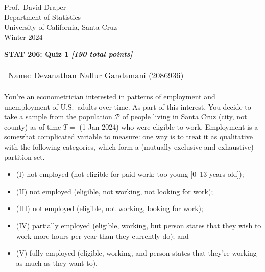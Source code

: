 \documentclass[12pt]{article}
\begin{document}
\begin{flushleft}

Prof.~David Draper \\
Department of Statistics \\
University of California, Santa Cruz \\
Winter 2024

\end{flushleft}

\begin{center}

\textbf{\large STAT 206: {\color{BrickRed} Quiz 1} \textit{[190 total points]}}

\end{center}

\begin{tabular}{ll}

\hspace*{-0.14in} Name: \underline{Devanathan Nallur Gandamani (2086936) \hspace*{3.0in}} \\

\end{tabular}

\vspace*{0.1in}

You're an econometrician interested in patterns of employment and unemployment of U.S.~adults over time. As part of this interest, You decide to take a sample from the population $\mathcal{ P }$ of people living in Santa Cruz (city, not county) as of time $T =$ (1 Jan 2024) who were eligible to work. Employment is a somewhat complicated variable to measure: one way is to treat it as qualitative with the following categories, which form a (mutually exclusive and exhaustive) partition set.

\begin{itemize}

\item

(I) not employed (not eligible for paid work: too young [0--13 years old]);

\item

(II) not employed (eligible, not working, not looking for work);

\item

(III) not employed (eligible, not working, looking for work);

\item

(IV) partially employed (eligible, working, but person states that they wish to work more hours per year than they currently do); and

\item

(V) fully employed (eligible, working, and person states that they're working as much as they want to).

\end{itemize}
\end{document}
